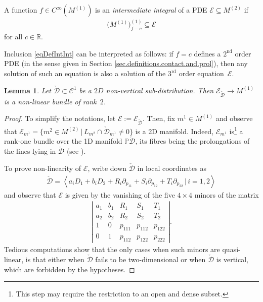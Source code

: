 \documentclass[10pt,a4paper]{amsart}
\newcommand{\R}{\mathbb{R}}
\newcommand{\C}{\mathcal{C}}
\newcommand{\E}{\mathcal{E}}
\newcommand{\Span}[1]{\left\langle #1 \right\rangle}
\renewcommand{\P}{\mathbb{P}}
\newcommand{\Rd}{^\textrm{rd}}
\newcommand{\Nd}{^\textrm{nd}}
\newcommand{\Ddue}{{\check{\mathcal{D}}}}
\numberwithin{equation}{section}
\newtheorem{Lemma}[Theorem]{Lemma}
\begin{document}
\begin{Definition}
A function $f\in C^\infty(M^{(1)})$ is an \emph{intermediate integral} of a PDE $\E\subseteq M^{(2)}$ if
 \begin{gather}\label{eqDefIntInt}
\big(M^{(1)}\big)_{f-c}^{(1)}\subseteq\E
\end{gather}
for all $c\in\R$.
\end{Definition}

Inclusion \eqref{eqDefIntInt} can be interpreted as follows: if $f=c$ def\/ines a $2\Nd$ order PDE (in the sense given in Section \ref{sec.definitions.contact.and.prol}), then any solution of such an equation is also a solution of the $3\Rd$ order equation~$\E$.

\begin{Lemma}\label{LemmaPartoritoConTantaSofferenza}
 Let $\Ddue\subset\C^1$ be a $2D$ non-vertical
 sub-distribution.
 Then $\E_\Ddue\longrightarrow M^{(1)}$ is a non-linear bundle of rank~$2$.
\end{Lemma}

\begin{proof}
To simplify the notations, let $\E:=\E_\Ddue$. Then,
f\/ix $m^1\in M^{(1)}$ and observe that
$
\E_{m^1}=\{m^2\in M^{(2)}\,|\, L_{m^2}\cap\Ddue_{m^1} \neq 0\}
$
is a 2D manifold. Indeed, $\E_{m^1}$ is\footnote{This step may require the restriction to an open and dense subset.} a rank-one bundle over the 1D manifold $\P\Ddue$, its f\/ibres being the prolongations of the lines lying in $\Ddue$ (see \cite[Proposition 2.5]{MR1670044}).

To prove non-linearity of $\E$, write down $\Ddue$ in local coordinates as
\begin{gather*}
\Ddue=\Span{a_iD_1+b_iD_2+R_i\partial_{p_{11}}+S_i\partial_{p_{12}}+T_i\partial_{p_{22}}\,|\, i=1,2}
\end{gather*} and observe that $\E$ is given by the vanishing of the f\/ive $4\times 4$ minors of the matrix
\begin{gather*}
\left|\begin{matrix}a_1 & b_1 & R_1 & S_1 & T_1 \\a_2 & b_2 & R_2 & S_2 & T_2 \\1 & 0 & p_{111} & p_{112} & p_{122} \\0 & 1 & p_{112} & p_{122} & p_{222}\end{matrix}\right|.
\end{gather*}
Tedious  computations show that the only cases when such minors are quasi-linear, is that \mbox{either} when $\Ddue$ fails to be two-dimensional or when $\Ddue$ is vertical, which are forbidden by the hypo\-theses.
\end{proof}
\end{document}
